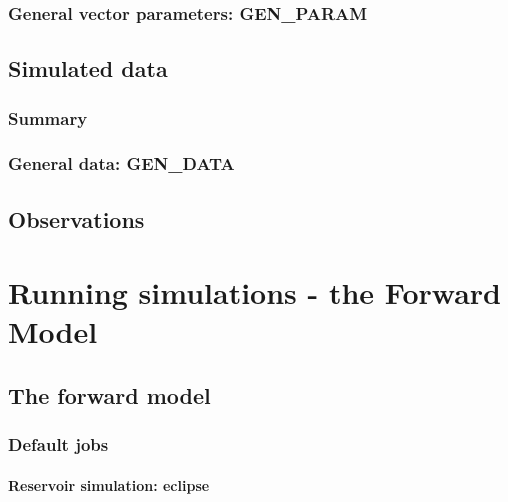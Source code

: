 \documentclass[a4paper,10pt,english]{sphinxmanual}
\begin{document}
\subsection{General vector parameters: GEN\_PARAM}
\label{\detokenize{data_types/index:general-vector-parameters-gen-param}}

\section{Simulated data}
\label{\detokenize{data_types/index:simulated-data}}

\subsection{Summary}
\label{\detokenize{data_types/index:summary}}

\subsection{General data: GEN\_DATA}
\label{\detokenize{data_types/index:general-data-gen-data}}

\section{Observations}
\label{\detokenize{data_types/index:observations}}

\chapter{Running simulations - the Forward Model}
\label{\detokenize{forward_model/index::doc}}\label{\detokenize{forward_model/index:running-simulations-the-forward-model}}

\section{The forward model}
\label{\detokenize{forward_model/index:the-forward-model}}

\subsection{Default jobs}
\label{\detokenize{forward_model/index:default-jobs}}

\subsubsection{Reservoir simulation: eclipse}
\label{\detokenize{forward_model/index:reservoir-simulation-eclipse}}
\end{document}
